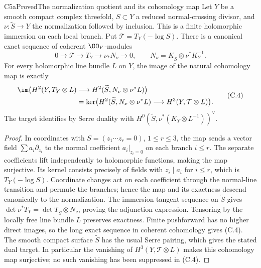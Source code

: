 \begin{statement}{C5a}{Proved}{The normalization quotient and its cohomology map}
Let $Y$ be a smooth compact complex threefold, $S\subset Y$ a reduced normal-crossing divisor, and $\nu:\widetilde S\to Y$ the normalization followed by inclusion. This is a finite holomorphic immersion on each local branch. Put $\mathcal T=T_Y(-\log S)$. There is a canonical exact sequence of coherent $\OO_Y$-modules
\[
0\longrightarrow\mathcal T\longrightarrow T_Y
 \longrightarrow\nu_*N_\nu\longrightarrow0,
\qquad N_\nu=K_{\widetilde S}\otimes\nu^*K_Y^{-1}.      \tag{C.3}
\]
For every holomorphic line bundle $L$ on $Y$, the image of the natural cohomology map is exactly
\[
\begin{split}
\im\bigl(H^2(Y,T_Y\otimes L)&\longrightarrow
 H^2(\widetilde S,N_\nu\otimes\nu^*L)\bigr)\\
 &=\ker\bigl(H^2(\widetilde S,N_\nu\otimes\nu^*L)
 \longrightarrow H^3(Y,\mathcal T\otimes L)\bigr).
\end{split}                                             \tag{C.4}
\]
The target identifies by Serre duality with
$H^0(\widetilde S,\nu^*(K_Y\otimes L^{-1}))^\vee$.
\end{statement}
\begin{proof}
In coordinates with $S=(z_1\cdots z_r=0)$, $1\le r\le3$, the map sends a vector field $\sum a_i\partial_{z_i}$ to the normal coefficient $a_i|_{z_i=0}$ on each branch $i\le r$. The separate coefficients lift independently to holomorphic functions, making the map surjective. Its kernel consists precisely of fields with $z_i\mid a_i$ for $i\le r$, which is $T_Y(-\log S)$. Coordinate changes act on each coefficient through the normal-line transition and permute the branches; hence the map and its exactness descend canonically to the normalization. The immersion tangent sequence on $\widetilde S$ gives $\det\nu^*T_Y=\det T_{\widetilde S}\otimes N_\nu$, proving the adjunction expression. Tensoring by the locally free line bundle $L$ preserves exactness. Finite pushforward has no higher direct images, so the long exact sequence in coherent cohomology gives (C.4). The smooth compact surface $\widetilde S$ has the usual Serre pairing, which gives the stated dual target. In particular the vanishing of $H^3(Y,\mathcal T\otimes L)$ makes this cohomology map surjective; no such vanishing has been suppressed in (C.4).
\end{proof}




